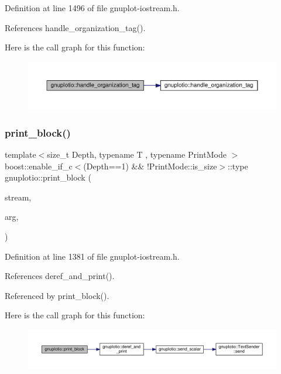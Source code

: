 Definition at line 1496 of file gnuplot-\/iostream.\+h.



References handle\+\_\+organization\+\_\+tag().

Here is the call graph for this function\+:\nopagebreak
\begin{figure}[H]
\begin{center}
\leavevmode
\includegraphics[width=350pt]{namespacegnuplotio_affc9cb6a9b6e5630523f0dbf8acdfcc2_cgraph}
\end{center}
\end{figure}
\mbox{\label{namespacegnuplotio_a631368ab4e255d2a5d563a41895f2edc}} 
\subsubsection{\texorpdfstring{print\+\_\+block()}{print\_block()}\hspace{0.1cm}{\footnotesize\ttfamily [1/4]}}
{\footnotesize\ttfamily template$<$size\+\_\+t Depth, typename T , typename Print\+Mode $>$ \\
boost\+::enable\+\_\+if\+\_\+c$<$(Depth==1) \&\& !Print\+Mode\+::is\+\_\+size$>$\+::type gnuplotio\+::print\+\_\+block (\begin{DoxyParamCaption}\item[{std\+::ostream \&}]{stream,  }\item[{T \&}]{arg,  }\item[{Print\+Mode}]{ }\end{DoxyParamCaption})}



Definition at line 1381 of file gnuplot-\/iostream.\+h.



References deref\+\_\+and\+\_\+print().



Referenced by print\+\_\+block().

Here is the call graph for this function\+:\nopagebreak
\begin{figure}[H]
\begin{center}
\leavevmode
\includegraphics[width=350pt]{namespacegnuplotio_a631368ab4e255d2a5d563a41895f2edc_cgraph}
\end{center}
\end{figure}
\mbox{\label{namespacegnuplotio_a753a3551f418723c022be60c12379025}} 
